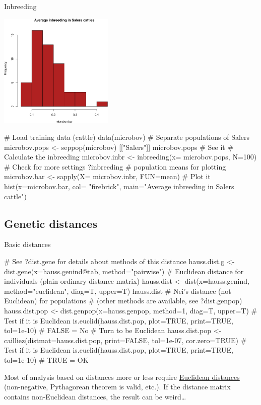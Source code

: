 \documentclass[compress, ucs, xelatex, 11pt, xcolor=svgnames,
	hyperref={
		bookmarks=true,
		unicode=true,
		colorlinks=true,
		pdftitle={Molecular data in R},
		plainpages=false,
		pdfauthor={Vojtech Zeisek},
		pdfsubject={Course about phylogeny and evolution in R},
		pdfcreator={XeLaTeX},
		pdfkeywords={R, evolution, phylogeny, molecular data},
		linkcolor=Tomato,
		anchorcolor=SaddleBrown,
		citecolor=Goldenrod,
		filecolor=DarkMagenta,
		menucolor=Sienna,
		urlcolor=DarkTurquoise,
		pdftex},
	url={hyphens, lowtilde} %
	]{beamer}
\begin{document}
\begin{frame}[fragile]{Inbreeding}
	\begin{multicols}{2}
		\includegraphics[height=5.5cm]{inbreeding.png}
		\begin{spluscode}
    # Load training data (cattle)
    data(microbov)
    # Separate populations of Salers
    microbov.pops <- seppop(microbov)
      [["Salers"]]
    microbov.pops # See it
    # Calculate the inbreeding
    microbov.inbr <- inbreeding(x=
      microbov.pops, N=100)
    # Check for more settings
    ?inbreeding
    # population means for plotting
    microbov.bar <- sapply(X=
      microbov.inbr, FUN=mean)
    # Plot it
    hist(x=microbov.bar, col=
      "firebrick", main="Average
      inbreeding in Salers cattle")
		\end{spluscode}
	\end{multicols}
\end{frame}

\subsection{Genetic distances}

\begin{frame}[fragile]{Basic distances}
	\label{distances}
	\begin{spluscode}
    # See ?dist.gene for details about methods of this distance
    hauss.dist.g <- dist.gene(x=hauss.genind@tab, method="pairwise")
    # Euclidean distance for individuals (plain ordinary distance matrix)
    hauss.dist <- dist(x=hauss.genind, method="euclidean", diag=T, upper=T)
    hauss.dist
    # Nei's distance (not Euclidean) for populations
    # (other methods are available, see ?dist.genpop)
    hauss.dist.pop <- dist.genpop(x=hauss.genpop, method=1, diag=T, upper=T)
    # Test if it is Euclidean
    is.euclid(hauss.dist.pop, plot=TRUE, print=TRUE, tol=1e-10) # FALSE = No
    # Turn to be Euclidean
    hauss.dist.pop <- cailliez(distmat=hauss.dist.pop, print=FALSE,
      tol=1e-07, cor.zero=TRUE)
    # Test if it is Euclidean
    is.euclid(hauss.dist.pop, plot=TRUE, print=TRUE, tol=1e-10) # TRUE = OK
	\end{spluscode}
	\vfil
	Most of analysis based on distances more or less require \href{https://en.wikipedia.org/wiki/Euclidean_distance_matrix}{Euclidean distances} (non-negative, Pythagorean theorem is valid, etc.). If the distance matrix contains non-Euclidean distances, the result can be weird\ldots
	\vfill
\end{frame}
\end{document}
